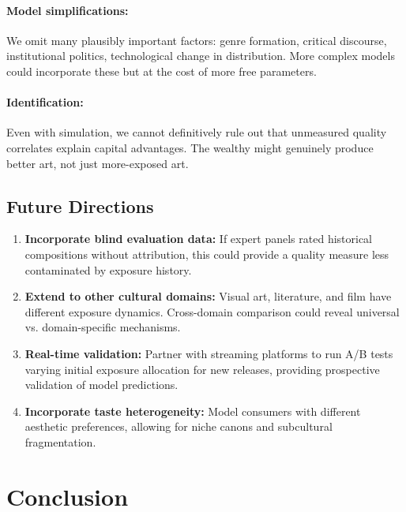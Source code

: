 \documentclass[11pt,a4paper]{article}
\begin{document}
\paragraph{Model simplifications:} We omit many plausibly important factors: genre formation, critical discourse, institutional politics, technological change in distribution. More complex models could incorporate these but at the cost of more free parameters.

\paragraph{Identification:} Even with simulation, we cannot definitively rule out that unmeasured quality correlates explain capital advantages. The wealthy might genuinely produce better art, not just more-exposed art.

\subsection{Future Directions}

\begin{enumerate}
    \item \textbf{Incorporate blind evaluation data:} If expert panels rated historical compositions without attribution, this could provide a quality measure less contaminated by exposure history.
    
    \item \textbf{Extend to other cultural domains:} Visual art, literature, and film have different exposure dynamics. Cross-domain comparison could reveal universal vs. domain-specific mechanisms.
    
    \item \textbf{Real-time validation:} Partner with streaming platforms to run A/B tests varying initial exposure allocation for new releases, providing prospective validation of model predictions.
    
    \item \textbf{Incorporate taste heterogeneity:} Model consumers with different aesthetic preferences, allowing for niche canons and subcultural fragmentation.
\end{enumerate}

\section{Conclusion}
\label{sec:conclusion}
\end{document}
